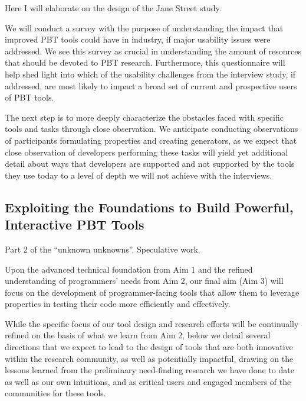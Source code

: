 Here I will elaborate on the design of the Jane Street study.


We will conduct a survey with the purpose of understanding the impact that
improved PBT tools could have in industry, if major usability issues were
addressed. We see this survey as crucial in understanding the amount of
resources that should be devoted to PBT research. Furthermore, this
questionnaire will help shed light into which of the usability challenges from
the interview study, if addressed, are most likely to impact a broad set of
current and prospective users of PBT tools.


The next step is to more deeply characterize the obstacles faced with specific
tools and tasks through close observation. We anticipate conducting observations
of participants formulating properties and creating generators, as we expect
that close observation of developers performing these tasks will yield yet
additional detail about ways that developers are supported and not supported by
the tools they use today to a level of depth we will not achieve with the
interviews.

\subsection{Exploiting the Foundations to Build Powerful, Interactive PBT Tools }

Part 2 of the ``unknown unknowns''.
Speculative work.

Upon the advanced technical foundation from Aim 1 and the refined understanding
of programmers' needs from Aim 2, our final aim (Aim 3) will focus on the
development of programmer-facing tools that allow them to leverage properties in
testing their code more efficiently and effectively.

While the specific focus of our tool design and research efforts will be
continually refined on the basis of what we learn from Aim 2, below we detail
several directions that we expect to lead to the design of tools that are both
innovative within the research community, as well as potentially impactful,
drawing on the lessons learned from the preliminary need-finding research we
have done to date as well as our own intuitions, and as critical users and
engaged members of the communities for these tools.

